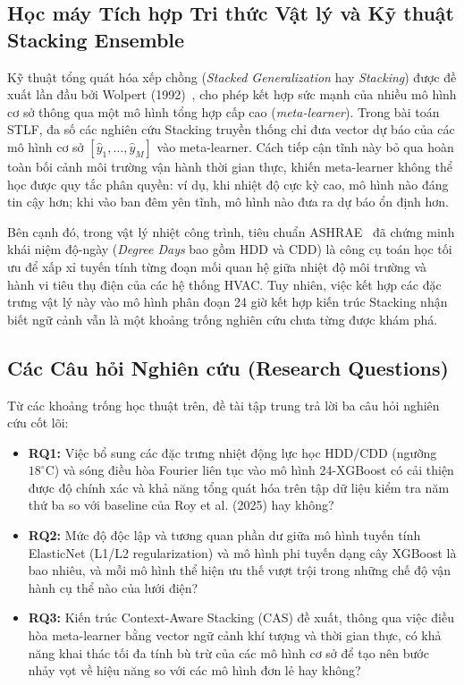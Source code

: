 \subsection{Học máy Tích hợp Tri thức Vật lý và Kỹ thuật Stacking Ensemble}
Kỹ thuật tổng quát hóa xếp chồng (\textit{Stacked Generalization} hay \textit{Stacking}) được đề xuất lần đầu bởi Wolpert (1992)~\cite{wolpert1992stacked}, cho phép kết hợp sức mạnh của nhiều mô hình cơ sở thông qua một mô hình tổng hợp cấp cao (\textit{meta-learner}). Trong bài toán STLF, đa số các nghiên cứu Stacking truyền thống chỉ đưa vector dự báo của các mô hình cơ sở $[\hat{y}_1, \dots, \hat{y}_M]$ vào meta-learner. Cách tiếp cận tĩnh này bỏ qua hoàn toàn bối cảnh môi trường vận hành thời gian thực, khiến meta-learner không thể học được quy tắc phân quyền: ví dụ, khi nhiệt độ cực kỳ cao, mô hình nào đáng tin cậy hơn; khi vào ban đêm yên tĩnh, mô hình nào đưa ra dự báo ổn định hơn.

Bên cạnh đó, trong vật lý nhiệt công trình, tiêu chuẩn ASHRAE~\cite{ashrae2021fundamentals} đã chứng minh khái niệm độ-ngày (\textit{Degree Days} bao gồm HDD và CDD) là công cụ toán học tối ưu để xấp xỉ tuyến tính từng đoạn mối quan hệ giữa nhiệt độ môi trường và hành vi tiêu thụ điện của các hệ thống HVAC. Tuy nhiên, việc kết hợp các đặc trưng vật lý này vào mô hình phân đoạn 24 giờ kết hợp kiến trúc Stacking nhận biết ngữ cảnh vẫn là một khoảng trống nghiên cứu chưa từng được khám phá.

\subsection{Các Câu hỏi Nghiên cứu (Research Questions)}
Từ các khoảng trống học thuật trên, đề tài tập trung trả lời ba câu hỏi nghiên cứu cốt lõi:
\begin{itemize}
    \item \textbf{RQ1:} Việc bổ sung các đặc trưng nhiệt động lực học HDD/CDD (ngưỡng $18^\circ\text{C}$) và sóng điều hòa Fourier liên tục vào mô hình 24-XGBoost có cải thiện được độ chính xác và khả năng tổng quát hóa trên tập dữ liệu kiểm tra năm thứ ba so với baseline của Roy et al. (2025) hay không?
    \item \textbf{RQ2:} Mức độ độc lập và tương quan phần dư giữa mô hình tuyến tính ElasticNet (L1/L2 regularization) và mô hình phi tuyến dạng cây XGBoost là bao nhiêu, và mỗi mô hình thể hiện ưu thế vượt trội trong những chế độ vận hành cụ thể nào của lưới điện?
    \item \textbf{RQ3:} Kiến trúc Context-Aware Stacking (CAS) đề xuất, thông qua việc điều hòa meta-learner bằng vector ngữ cảnh khí tượng và thời gian thực, có khả năng khai thác tối đa tính bù trừ của các mô hình cơ sở để tạo nên bước nhảy vọt về hiệu năng so với các mô hình đơn lẻ hay không?
\end{itemize}
